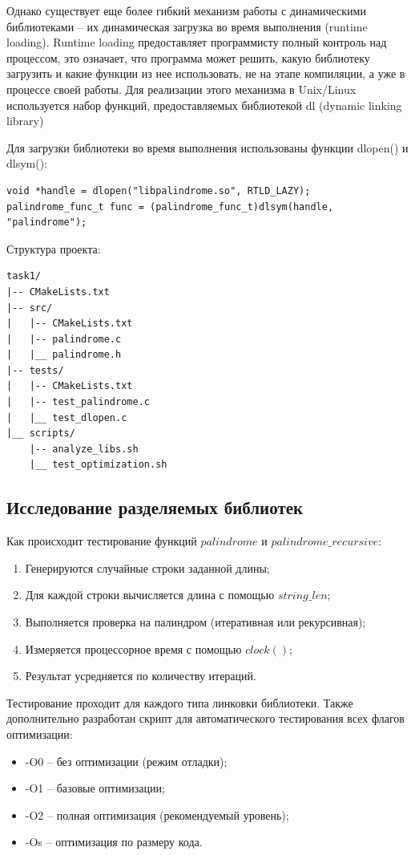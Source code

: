 \documentclass[14pt]{extreport}
\begin{document}
{Однако существует еще более гибкий механизм работы с динамическими библиотеками -- их динамическая загрузка во время выполнения (runtime loading).
Runtime loading предоставляет программисту полный контроль над процессом, это означает, что программа может решить, какую библиотеку загрузить и какие функции из нее использовать, не на этапе компиляции, а уже в процессе своей работы.
Для реализации этого механизма в Unix/Linux используется набор функций, предоставляемых библиотекой dl (dynamic linking library)

Для загрузки библиотеки во время выполнения использованы функции dlopen() и dlsym():
\begin{verbatim}
void *handle = dlopen("libpalindrome.so", RTLD_LAZY);
palindrome_func_t func = (palindrome_func_t)dlsym(handle, "palindrome");
\end{verbatim}

Структура проекта:
\begin{verbatim}
task1/
|-- CMakeLists.txt
|-- src/
|   |-- CMakeLists.txt
|   |-- palindrome.c
|   |__ palindrome.h
|-- tests/
|   |-- CMakeLists.txt
|   |-- test_palindrome.c
|   |__ test_dlopen.c
|__ scripts/
    |-- analyze_libs.sh
    |__ test_optimization.sh
\end{verbatim}

{\centering\subsection{Исследование разделяемых библиотек}}
Как происходит тестирование функций $palindrome$ и $palindrome\_recursive$:
\begin{enumerate}
    \item Генерируются случайные строки заданной длины;

    \item Для каждой строки вычисляется длина с помощью $string\_len$;

    \item Выполняется проверка на палиндром (итеративная или рекурсивная);

    \item Измеряется процессорное время с помощью $clock()$;

    \item Результат усредняется по количеству итераций.
\end{enumerate}
Тестирование проходит для каждого типа линковки библиотеки.
Также дополнительно разработан скрипт для автоматического тестирования всех флагов оптимизации:
\begin{itemize}
    \item -O0 -- без оптимизации (режим отладки);
    \item -O1	-- базовые оптимизации;
    \item -O2	-- полная оптимизация (рекомендуемый уровень);
    \item -Os	-- оптимизация по размеру кода.
\end{itemize}

}
\end{document}

